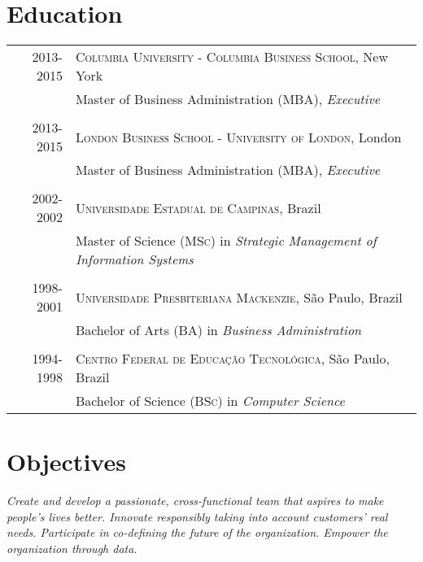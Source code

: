 \documentclass[a4paper,10pt]{article}
\begin{document}
\section{Education}
\begin{tabular}{rl}
 \textsc{2013-2015} & \textsc{Columbia University - Columbia Business School},
 New York\\

 & Master of Business Administration (\textsc{MBA}), \emph{Executive}\\

 &\\

 \textsc{2013-2015} & \textsc{London Business School - University of London},
 London\\

 & Master of Business Administration (\textsc{MBA}), \emph{Executive}\\

 &\\

 \textsc{2002-2002} & \textsc{Universidade Estadual de Campinas}, Brazil\\

 & Master of Science (\textsc{MSc}) in \emph{Strategic Management of Information
   Systems} \\

  &\\

 \textsc{1998-2001} & \textsc{Universidade Presbiteriana Mackenzie}, S\~{a}o
 Paulo, Brazil\\

 & Bachelor of Arts (\textsc{BA}) in \emph{Business Administration} \\

 &\\

 \textsc{1994-1998} & \textsc{Centro Federal de Educa\c{c}\~{a}o
   Tecnol\'{o}gica}, S\~{a}o Paulo, Brazil\\

 & Bachelor of Science (\textsc{BSc}) in \emph{Computer Science} \\

\end{tabular}

\section{Objectives}
\emph{Create and develop a passionate, cross-functional team that aspires to
  make people's lives better. Innovate responsibly taking into account
  customers' real needs. Participate in co-defining the future of the
  organization. Empower the organization through data.}
\end{document}
